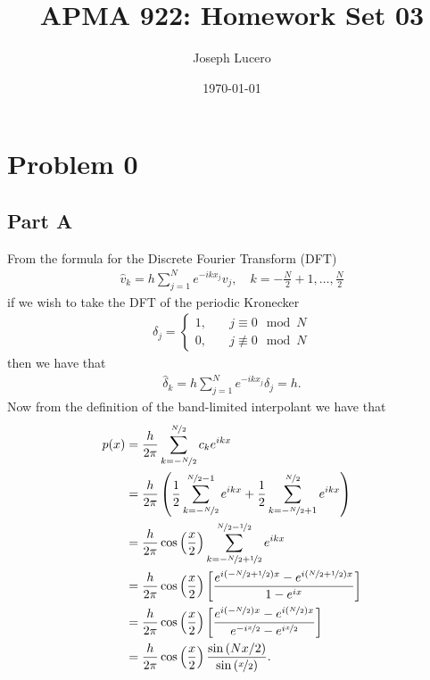 \documentclass[12pt]{article}
\title{APMA 922: Homework Set 03}
\author{Joseph Lucero}
\date{\today}
\newcommand{\vhat}{\hat{v}}
\newcommand{\dfte}{e^{-ikx_{j}}}
\begin{document}
\maketitle

\section*{Problem 0}

\subsection*{Part A}
From the formula for the Discrete Fourier Transform (DFT)
\begin{align}
	\vhat_{k} = h \sum\limits_{j=1}^{N}\dfte v_{j},\quad k=-\frac{N}{2}+1,\dots,\frac{N}{2}
\end{align}
if we wish to take the DFT of the periodic Kronecker 
\begin{align}
	\delta_{j} = 
	\begin{cases}
		1,&\quad j \equiv 0 \mod N \\
		0,&\quad j \not\equiv 0 \mod N 
	\end{cases}
\end{align}
then we have that
\begin{align}
	\hat{\delta}_{k} = h \sum\limits_{j=1}^{N}\dfte \delta_{j} = h.
\end{align}
Now from the definition of the band-limited interpolant we have that
\begin{subequations}
	\begin{align}
		p(x) &= \dfrac{h}{2\pi}\sum\limits_{k=-\nicefrac{N}{2}}^{\nicefrac{N}{2}}c_{k}e^{ikx}\label{eq:band_limited_interpolant}\\
		&= \dfrac{h}{2\pi}\left(\dfrac{1}{2}\sum\limits_{k=-\nicefrac{N}{2}}^{\nicefrac{N}{2}-1}e^{ikx}+\dfrac{1}{2}\sum\limits_{k=-\nicefrac{N}{2}+1}^{\nicefrac{N}{2}}e^{ikx}\right)\\
		&= \dfrac{h}{2\pi}\cos\left(\dfrac{x}{2}\right)\sum\limits_{k=-\nicefrac{N}{2}+\nicefrac{1}{2}}^{\nicefrac{N}{2}-\nicefrac{1}{2}}e^{ikx}\\
		&= \dfrac{h}{2\pi}\cos\left(\dfrac{x}{2}\right)\left[\dfrac{e^{i(-\nicefrac{N}{2}+\nicefrac{1}{2})x}-e^{i(\nicefrac{N}{2}+\nicefrac{1}{2})x}}{1-e^{ix}}\right]\\
		&= \dfrac{h}{2\pi}\cos\left(\dfrac{x}{2}\right)\left[\dfrac{e^{i(-\nicefrac{N}{2})x}-e^{i(\nicefrac{N}{2})x}}{e^{-i\nicefrac{x}{2}}-e^{i\nicefrac{x}{2}}}\right]\\
		&= \dfrac{h}{2\pi}\cos\left(\dfrac{x}{2}\right)\dfrac{\sin\left(Nx/2\right)}{\sin\left(\nicefrac{x}{2}\right)}. \label{eq:0A_last}
	\end{align}
\end{subequations}
\end{document}
